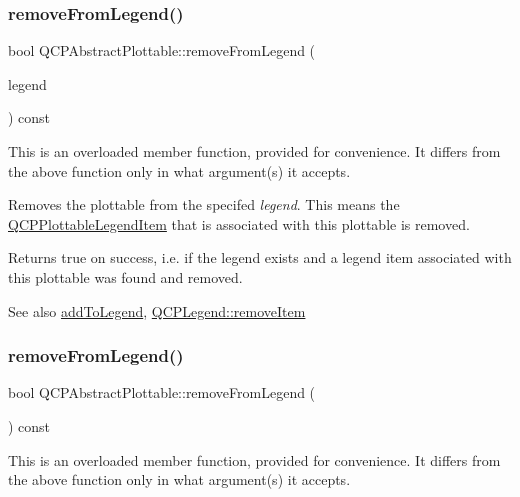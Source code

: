 \subsubsection{\texorpdfstring{remove\+From\+Legend()}{removeFromLegend()}\hspace{0.1cm}{\footnotesize\ttfamily [1/2]}}
{\footnotesize\ttfamily bool Q\+C\+P\+Abstract\+Plottable\+::remove\+From\+Legend (\begin{DoxyParamCaption}\item[{\mbox{\hyperlink{class_q_c_p_legend}{Q\+C\+P\+Legend}} $\ast$}]{legend }\end{DoxyParamCaption}) const}

This is an overloaded member function, provided for convenience. It differs from the above function only in what argument(s) it accepts.

Removes the plottable from the specifed {\itshape legend}. This means the \mbox{\hyperlink{class_q_c_p_plottable_legend_item}{Q\+C\+P\+Plottable\+Legend\+Item}} that is associated with this plottable is removed.

Returns true on success, i.\+e. if the legend exists and a legend item associated with this plottable was found and removed.

\begin{DoxySeeAlso}{See also}
\mbox{\hyperlink{class_q_c_p_abstract_plottable_aa64e93cb5b606d8110d2cc0a349bb30f}{add\+To\+Legend}}, \mbox{\hyperlink{class_q_c_p_legend_ac91595c3eaa746fe6321d2eb952c63bb}{Q\+C\+P\+Legend\+::remove\+Item}} 
\end{DoxySeeAlso}
\mbox{\label{class_q_c_p_abstract_plottable_ac95fb2604d9106d0852ad9ceb326fe8c}} 
\subsubsection{\texorpdfstring{remove\+From\+Legend()}{removeFromLegend()}\hspace{0.1cm}{\footnotesize\ttfamily [2/2]}}
{\footnotesize\ttfamily bool Q\+C\+P\+Abstract\+Plottable\+::remove\+From\+Legend (\begin{DoxyParamCaption}{ }\end{DoxyParamCaption}) const}

This is an overloaded member function, provided for convenience. It differs from the above function only in what argument(s) it accepts.

